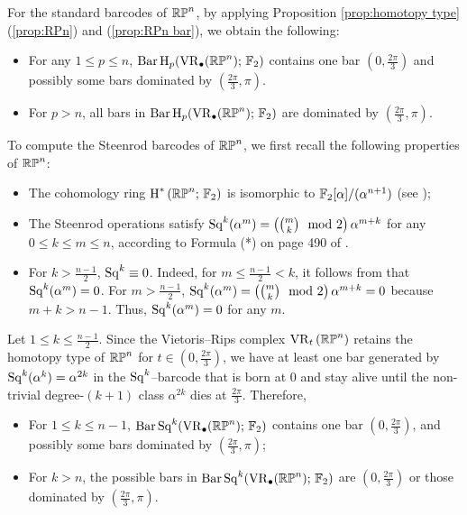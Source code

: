 For the standard barcodes of $\mathbb{RP}^n$, by applying Proposition \ref{prop:homotopy type} (\ref{prop:RPn}) and (\ref{prop:RPn bar}), %
we obtain the following:
\begin{itemize}
	\item For any $1\leq p\leq n$, $\operatorname{Bar} \operatorname{H}_{p}(\operatorname{VR}_\bullet(\mathbb{RP}^n);\,{\mathbb{F}_2})$ contains one bar $\left(0,\frac{2\pi}{3}\right)$ and possibly some bars  dominated by $\left(\frac{2\pi}{3},\pi\right)$.
	\item For $p>n$, all bars in $\operatorname{Bar} \operatorname{H}_{p}(\operatorname{VR}_\bullet(\mathbb{RP}^n);\,{\mathbb{F}_2})$ are dominated by $\left(\frac{2\pi}{3},\pi\right)$.
\end{itemize}

To compute the Steenrod barcodes of $\mathbb{RP}^n$, we first recall the following properties of $\mathbb{RP}^n$:
\begin{itemize}
	\item The cohomology ring $\operatorname{H}^*\left(\mathbb{RP}^n;\,{\mathbb{F}_2}\right)$ is isomorphic to ${\mathbb{F}_2}[\alpha]/(\alpha^{n+1})$ (see \cite[Theorem 3.19]{hatcher2000});
	\item The Steenrod operations satisfy $\operatorname{Sq}^k(\alpha^m)=\left({m \choose k} \mod 2\right)\alpha^{m+k}$ for any $0\leq k\leq m\leq n$, according to Formula (*) on page 490 of \cite{hatcher2000}.
	\item For $k>\frac{n-1}{2}$, $\operatorname{Sq}^k\equiv 0$. Indeed, for $m\leq \frac{n-1}{2}<k$, it follows from \cite[page 489, Item (5)]{hatcher2000} that $\operatorname{Sq}^k(\alpha^m)=0$. For $m> \frac{n-1}{2}$, $\operatorname{Sq}^k(\alpha^m)=\left({m \choose k} \mod 2\right)\alpha^{m+k}=0$ because $m+k>n-1.$ Thus, $\operatorname{Sq}^k(\alpha^m)=0$ for any $m$.
\end{itemize}
Let $1\leq k\leq \frac{n-1}{2}$. Since the Vietoris--Rips complex $\operatorname{VR}_t\left(\mathbb{RP}^n\right)$ retains the homotopy type of $\mathbb{RP}^n$ for $t\in \left(0,\frac{2\pi}{3}\right)$, we have at least one bar generated by $\operatorname{Sq}^k(\alpha^k)=\alpha^{2k}$ in the $\operatorname{Sq}^k$--barcode that is born at $0$ and stay alive until the non-trivial degree-$(k+1)$ class $\alpha^{2k}$ dies at $\frac{2\pi}{3}$. Therefore,
\begin{itemize}
	\item For $1\leq k\leq n-1$, $\operatorname{Bar}\operatorname{Sq}^{k}(\operatorname{VR}_\bullet(\mathbb{RP}^n);\,{\mathbb{F}_2})$ contains one bar $\left(0,\frac{2\pi}{3}\right)$, and possibly some bars dominated by $\left(\frac{2\pi}{3},\pi\right)$;
	\item For $k>n$, the possible bars in $\operatorname{Bar}\operatorname{Sq}^{k}(\operatorname{VR}_\bullet(\mathbb{RP}^n);\,{\mathbb{F}_2})$ are $\left(0,\frac{2\pi}{3}\right)$ or those dominated by $\left(\frac{2\pi}{3},\pi\right)$.
\end{itemize}

